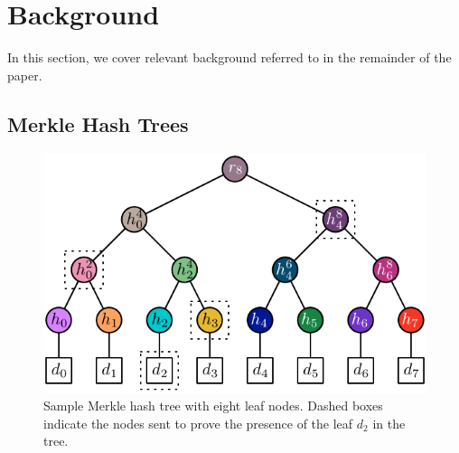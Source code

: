 \section{Background}
\label{sec:background}

In this section, we cover relevant background referred to in the remainder of
the paper.



\subsection{Merkle Hash Trees}
\label{sec:background:mht}

\begin{figure}
  \centering
  \includegraphics[width=\linewidth]{fig/mht-audit}
  \caption{Sample Merkle hash tree with eight leaf nodes. Dashed boxes indicate
  the nodes sent to prove the presence of the leaf $d_2$ in the tree.}
  \label{fig:mht-audit}
\end{figure}

